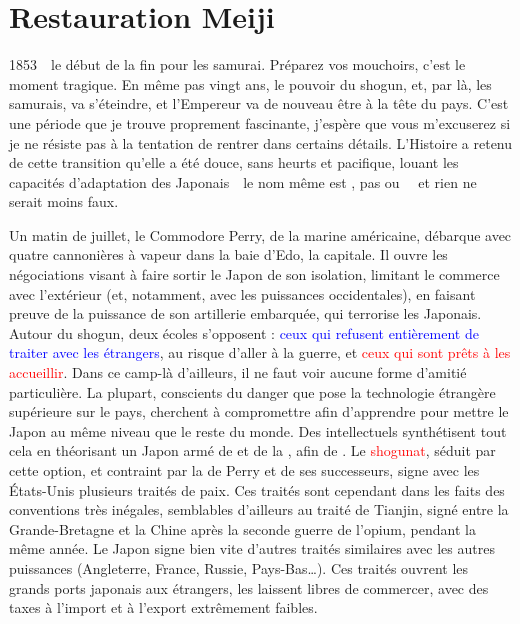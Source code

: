 \chapter{Restauration Meiji}


1853~\incise~le début de la fin pour les samurai. Préparez vos mouchoirs, c'est
le moment tragique. En même pas vingt ans, le pouvoir du shogun, et, par là,
les samurais, va s'éteindre, et l'Empereur va de nouveau être à la tête du
pays. C'est une période que je trouve proprement fascinante, j'espère que vous
m'excuserez si je ne résiste pas à la tentation de rentrer dans certains
détails. L'Histoire a retenu de cette transition qu'elle a été douce, sans
heurts et pacifique, louant les capacités d'adaptation des Japonais~\incise~le
nom même est , pas  ou ~\incise~et rien ne serait moins faux.

Un matin de juillet, le Commodore Perry, de la marine américaine, débarque
avec quatre cannonières à vapeur dans la baie d'Edo, la capitale. Il ouvre les
négociations visant à faire sortir le Japon de son isolation, limitant le
commerce avec l'extérieur (et, notamment, avec les puissances occidentales),
en faisant preuve de la puissance de son artillerie embarquée, qui terrorise
les Japonais. Autour du shogun, deux écoles s'opposent : \textcolor{blue}{ceux
qui refusent entièrement de traiter avec les étrangers}, au risque d'aller à
la guerre, et \textcolor{red}{ceux qui sont prêts à les accueillir}. Dans ce
camp-là d'ailleurs, il ne faut voir aucune forme d'amitié particulière. La
plupart, conscients du danger que pose la technologie étrangère supérieure sur
le pays, cherchent à compromettre afin d'apprendre pour mettre le Japon au
même niveau que le reste du monde. Des intellectuels synthétisent tout cela en
théorisant un Japon armé de  et de la
, afin de . Le \textcolor{red}{shogunat}, séduit par cette option, et
contraint par la  de Perry et de ses
successeurs, signe avec les États-Unis plusieurs traités de paix. Ces traités
sont cependant dans les faits des conventions très inégales, semblables
d'ailleurs au traité de Tianjin, signé entre la Grande-Bretagne et la Chine
après la seconde guerre de l'opium, pendant la même année. Le Japon signe bien
vite d'autres traités similaires avec les autres puissances (Angleterre,
France, Russie, Pays-Bas\dots). Ces traités ouvrent les grands ports japonais
aux étrangers, les laissent libres de commercer, avec des taxes à l'import et
à l'export extrêmement faibles.

